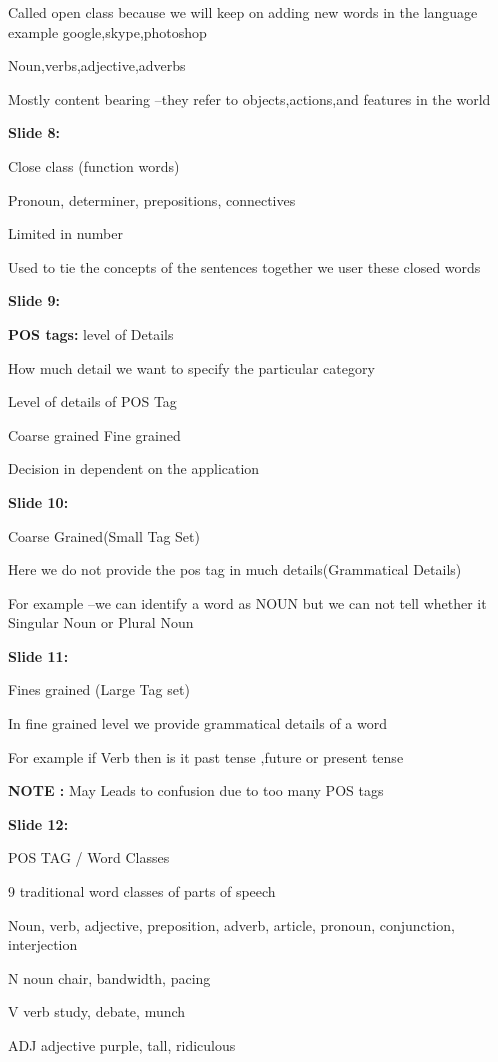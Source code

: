 \documentclass[11pt,a4paper]{article}
\begin{document}
Called open class because we will keep on adding new words in the language example google,skype,photoshop

Noun,verbs,adjective,adverbs

Mostly content bearing –they refer to objects,actions,and features in the world

\textbf{Slide 8:}

Close class (function words)

Pronoun, determiner, prepositions, connectives

Limited in number

Used to tie the concepts of the sentences together we user these closed words

\textbf{Slide 9:}

\textbf{POS tags:}  level of Details

How much detail we want to specify the particular category

Level of details of POS Tag

Coarse grained                          Fine grained

Decision in dependent on the application

\textbf{Slide 10:}

Coarse Grained(Small Tag Set)

Here we do not provide the pos tag in much details(Grammatical Details)

For example –we can identify a word as NOUN but we can not tell whether it Singular Noun or Plural Noun

\textbf{Slide 11:}

Fines grained (Large Tag set)

In fine grained level we provide grammatical details of a word

For example if Verb then is it past tense ,future or present  tense

\textbf{NOTE :} May Leads to confusion due to too many POS tags

\textbf{Slide 12:}

POS TAG / Word Classes

9  traditional word classes of parts of speech

Noun, verb, adjective, preposition, adverb, article, pronoun, conjunction, interjection

N		noun		chair, bandwidth, pacing

V		verb		study, debate, munch

ADJ		adjective	purple, tall, ridiculous
\end{document}
